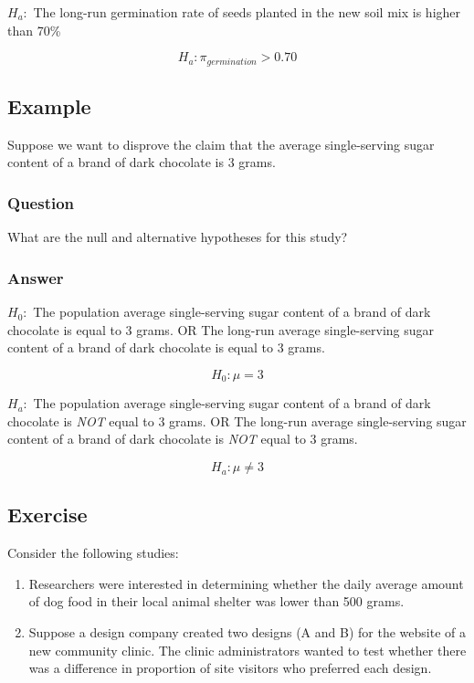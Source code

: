 \documentclass[
  letterpaper,
  DIV=11,
  numbers=noendperiod]{scrartcl}
\begin{document}
\(H_a:\) The long-run germination rate of seeds planted in the new soil
mix is higher than 70\%

\[
H_a: \pi_{germination} > 0.70
\]

\subsection{Example}\label{example-2}

Suppose we want to disprove the claim that the average single-serving
sugar content of a brand of dark chocolate is 3 grams.

\subsubsection{Question}

What are the null and alternative hypotheses for this study?

\subsubsection{Answer}

\(H_0:\) The population average single-serving sugar content of a brand
of dark chocolate is equal to 3 grams. OR The long-run average
single-serving sugar content of a brand of dark chocolate is equal to 3
grams.

\[
H_0: \mu = 3
\]

\(H_a:\) The population average single-serving sugar content of a brand
of dark chocolate is \emph{NOT} equal to 3 grams. OR The long-run
average single-serving sugar content of a brand of dark chocolate is
\emph{NOT} equal to 3 grams.

\[
H_a: \mu \neq 3
\]

\subsection{Exercise}\label{exercise}

Consider the following studies:

\begin{enumerate}
\def\labelenumi{\arabic{enumi}.}
\item
  Researchers were interested in determining whether the daily average
  amount of dog food in their local animal shelter was lower than 500
  grams.
\item
  Suppose a design company created two designs (A and B) for the website
  of a new community clinic. The clinic administrators wanted to test
  whether there was a difference in proportion of site visitors who
  preferred each design.
\end{enumerate}
\end{document}
